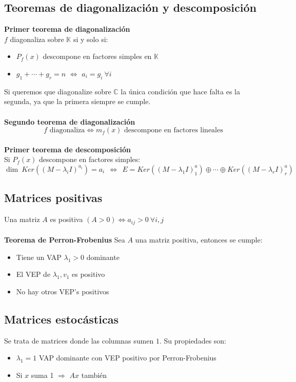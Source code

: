 \documentclass[12pt]{article}
\begin{document}
	
	\subsection{Teoremas de diagonalización y descomposición}
	\textbf{Primer teorema de diagonalización}\\
	$f$ diagonaliza sobre $\mathbb{K}$ si y solo si:
	\begin{itemize}
		\item $P_f(x)$ descompone en factores simples en $\mathbb{K}$
		\item $g_1+\cdots +g_r=n$ $\iff$ $a_i=g_i \ \forall i$
	\end{itemize}
	Si queremos que diagonalize sobre $\mathbb{C}$ la única condición que hace falta es la segunda, ya que la primera siempre se cumple. \\
	\\
	\textbf{Segundo teorema de diagonalización}
	\[f \text{ diagonaliza} \iff m_f(x)  \text{ descompone en factores lineales}\]	
	\\
	\textbf{Primer teorema de descomposición}\\
	Si $P_f(x)$ descompone en factores simples:
	\[\dim \ Ker((M-\lambda_iI)^{a_i})=a_i \ \ \iff \ \ E=Ker((M-\lambda_1I)^a_1)\oplus \cdots \oplus Ker((M-\lambda_rI)^a_r)\]
	
	
	\subsection{Matrices positivas}
	Una matriz $A$ es positiva $(A>0) \iff a_{ij}>0 \ \forall i,j$ \\
	\\
	\textbf{Teorema de Perron-Frobenius}
	Sea $A$ una matriz positiva, entonces se cumple:
	\begin{itemize}
		\item Tiene un VAP $\lambda_1 > 0$ dominante
		\item El VEP de $\lambda_1, v_1$ es positivo
		\item No hay otros VEP's positivos
	\end{itemize}
	\subsection{Matrices estocásticas}
	Se trata de matrices donde las columnas sumen $1$. Su propiedades son:
	\begin{itemize}
		\item $\lambda_1=1$ VAP dominante con VEP positivo por Perron-Frobenius
		\item Si $x$ suma 1 $\Rightarrow$ $Ax$ también 
	\end{itemize}
	
\end{document}
